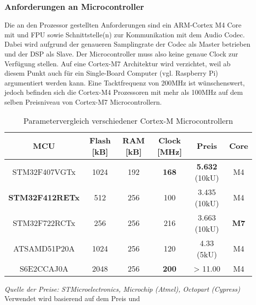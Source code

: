 \subsubsection{Anforderungen an Microcontroller}
\label{sec:Konzept_Microcontroller}

Die an den Prozessor gestellten Anforderungen sind ein ARM-Cortex M4 Core mit und FPU sowie Schnittstelle(n) zur Kommunikation mit dem Audio Codec. 
Dabei wird aufgrund der genaueren Samplingrate der Codec als Master betrieben und der DSP als Slave.
Der Microcontroller muss also keine genaue Clock zur Verfügung stellen. 
Auf eine Cortex-M7 Architektur wird verzichtet, weil ab diesem Punkt auch für ein Single-Board Computer (vgl. Raspberry Pi) argumentiert werden kann.
Eine Tacktfrequenz von 200MHz ist wünschenswert, jedoch befinden sich die Cortex-M4 Prozessoren mit mehr als 100MHz auf dem selben Preisniveau von Cortex-M7 Microcontrollern.

\begin{table}[H]
	\centering
	\begin{tabular}{|c|c|c|c|c|c|}
		\hline
		\textbf{MCU}  & \textbf{Flash {[}kB{]}} & \textbf{RAM {[}kB{]}} & \textbf{Clock {[}MHz{]}} & \textbf{Preis} & \textbf{Core} \\ \hline
		STM32F407VGTx & 1024                    & 192                   & \textbf{168}             & \textbf{5.632} (10kU) & M4            \\ \hline
		\textbf{STM32F412RETx} & 512            & 256                   & 100                      & 3.435 (10kU)        & M4            \\ \hline
		STM32F722RCTx & 256                     & 256                   & 216                      & 3.663 (10kU)        & \textbf{M7}   \\ \hline
		ATSAMD51P20A  & 1024                    & 256                   & 120                      & 4.33 (5kU)          & M4            \\
		\hline
		S6E2CCAJ0A    & 2048                    & 256                   & \textbf{200}             & > 11.00             & M4            \\
		\hline
	\end{tabular}
 	\caption{Parametervergleich verschiedener Cortex-M Microcontrollern}
 	\label{tab:ComparisonMCU}
\end{table}

\textit{Quelle der Preise: STMicroelectronics, Microchip (Atmel), Octopart (Cypress)} \\

Verwendet wird basierend auf dem Preis und 


